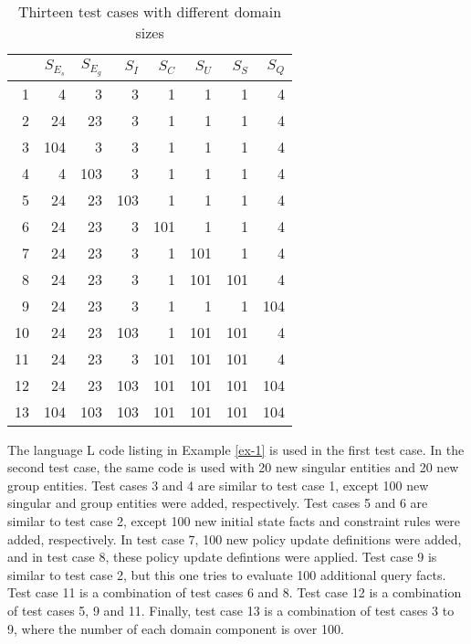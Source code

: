 \documentclass[glov2,twocolumn,final]{svjour2}
\begin{document}
      \begin{table}[ht]
        \begin{center}
          \begin{tabular}[t]{|r|r|r|r|r|r|r|r|}
            \hline
            &
            \textbf{$S_{E_{s}}$} &
            \textbf{$S_{E_{g}}$} &
            \textbf{$S_{I}$} &
            \textbf{$S_{C}$} &
            \textbf{$S_{U}$} &
            \textbf{$S_{S}$} &
            \textbf{$S_{Q}$} \\
            \hline
            1 & 4 & 3 & 3 & 1 & 1 & 1 & 4 \\
            \hline
            2 & 24 & 23 & 3 & 1 & 1 & 1 & 4 \\
            \hline
            3 & 104 & 3 & 3 & 1 & 1 & 1 & 4 \\
            \hline
            4 & 4 & 103 & 3 & 1 & 1 & 1 & 4 \\
            \hline
            5 & 24 & 23 & 103 & 1 & 1 & 1 & 4 \\
            \hline
            6 & 24 & 23 & 3 & 101 & 1 & 1 & 4 \\
            \hline
            7 & 24 & 23 & 3 & 1 & 101 & 1 & 4 \\
            \hline
            8 & 24 & 23 & 3 & 1 & 101 & 101 & 4 \\
            \hline
            9 & 24 & 23 & 3 & 1 & 1 & 1 & 104 \\
            \hline
            10 & 24 & 23 & 103 & 1 & 101 & 101 & 4 \\
            \hline
            11 & 24 & 23 & 3 & 101 & 101 & 101 & 4 \\
            \hline
            12 & 24 & 23 & 103 & 101 & 101 & 101 & 104 \\
            \hline
            13 & 104 & 103 & 103 & 101 & 101 & 101 & 104 \\
            \hline
          \end{tabular}
        \end{center}
        \caption[]{Thirteen test cases with different domain sizes}
        \label{tab-1}
      \end{table}

      The language {\cal L} code listing in Example \ref{ex-1} is used in the
      first test case. In the second test case, the same code is used with 20
      new singular entities and 20 new group entities. Test cases 3 and 4 are
      similar to test case 1, except 100 new singular and group entities were
      added, respectively. Test cases 5 and 6 are similar to test case 2,
      except 100 new initial state facts and constraint rules were added,
      respectively. In test case 7, 100 new policy update definitions were
      added, and in test case 8, these policy update defintions were applied.
      Test case 9 is similar to test case 2, but this one tries to evaluate 100
      additional query facts. Test case 11 is a combination of test cases 6 and
      8. Test case 12 is a combination of test cases 5, 9 and 11. Finally, test
      case 13 is a combination of test cases 3 to 9, where the number of each
      domain component is over 100.
\end{document}
